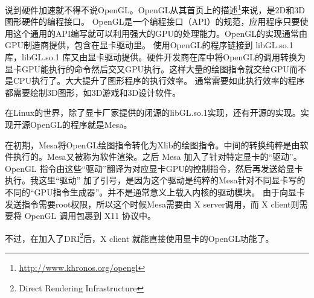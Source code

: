 \documentclass[amstex,twoside]{ctexbook}
\begin{document}
说到硬件加速就不得不说OpenGL。OpenGL从其首页上的描述\footnote{ \url{http://www.khronos.org/opengl} }来说，是2D和3D图形硬件的编程接口。
OpenGL是一个编程接口（API）的规范，应用程序只要使用这个通用的API编写就可以利用强大的GPU的处理能力。OpenGL的实现通常由GPU制造商提供，包含在显卡驱动里。
使用OpenGL的程序链接到 libGL.so.1 库，libGL.so.1 库又由显卡驱动提供。硬件开发商在库中将OpenGL的调用转换为显卡GPU能执行的命令然后交又GPU执行。这样大量的绘图指令就交给GPU而不是CPU执行了。大大提升了图形程序的执行效率。
通常需要如此执行效率的程序都需要绘制3D图形，如3D游戏和3D设计软件。

在Linux的世界，除了显卡厂家提供的闭源的libGL.so.1实现，还有开源的实现。实现开源OpenGL的程序就是Mesa。

在初期，Mesa将OpenGL绘图指令转化为Xlib的绘图指令。中间的转换纯粹是由软件执行的。Mesa又被称为软件渲染。之后 Mesa 加入了针对特定显卡的“驱动”。OpenGL 指令由这些“驱动”翻译为对应显卡GPU的控制指令，然后再发送给显卡执行。我这里“驱动” 加了引号，是因为这个驱动是纯粹的Mesa针对不同显卡写的不同的“GPU指令生成器”。并不是通常意义上载入内核的驱动模块。
由于向显卡发送指令需要root权限，所以这个时候Mesa需要由 X server调用，而 X client则需要将 OpenGL 调用包裹到 X11 协议中。

不过，在加入了DRI\footnote{Direct Rendering Infrastructure}后，X client 就能直接使用显卡的OpenGL功能了。
\end{document}
